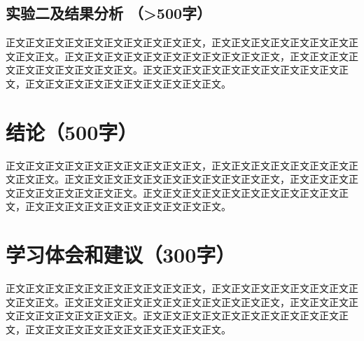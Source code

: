 \documentclass{article}
\begin{document}
\subsection{实验二及结果分析 （>500字）}
正文正文正文正文正文正文正文正文正文正文，正文正文正文正文正文正文正文正文正文正文。正文正文正文正文正文正文正文正文正文正文正文，正文正文正文正文正文正文正文正文正文正文。正文正文正文正文正文正文正文正文正文正文正文，正文正文正文正文正文正文正文正文正文正文。

\section{结论（500字）}
正文正文正文正文正文正文正文正文正文正文，正文正文正文正文正文正文正文正文正文正文。正文正文正文正文正文正文正文正文正文正文正文，正文正文正文正文正文正文正文正文正文正文。正文正文正文正文正文正文正文正文正文正文正文，正文正文正文正文正文正文正文正文正文正文。

\section{学习体会和建议（300字）}
正文正文正文正文正文正文正文正文正文正文，正文正文正文正文正文正文正文正文正文正文。正文正文正文正文正文正文正文正文正文正文正文，正文正文正文正文正文正文正文正文正文正文。正文正文正文正文正文正文正文正文正文正文正文，正文正文正文正文正文正文正文正文正文正文。


\newpage{}
\appendix
\end{document}
